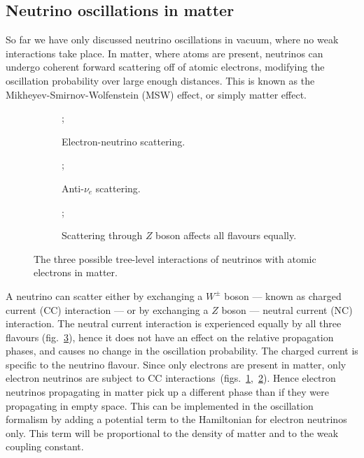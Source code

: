 \subsection{Neutrino oscillations in matter}
So far we have only discussed neutrino oscillations in vacuum, where no weak
interactions take place.
In matter, where atoms are present, neutrinos can undergo coherent forward
scattering off of atomic electrons, modifying the oscillation probability over
large enough distances. This is known as the Mikheyev-Smirnov-Wolfenstein (MSW)
effect\cite{wolfenstein, mikheyev-smirnov}, or simply matter effect.
\begin{figure}
	\centering
	\begin{subfigure}{0.3\textwidth}
		\centering
	;
		\caption{Electron-neutrino scattering.}
		\label{fig:nu_e-scatter}
	\end{subfigure}
	\begin{subfigure}{0.3\textwidth}
		\centering
		;
			\caption{Anti-$\nu_e$ scattering.}
			\label{fig:anti-nu_e-scatter}
	\end{subfigure}
	\begin{subfigure}{0.3\textwidth}
		\centering
		;
		\caption{Scattering through $Z$ boson affects all flavours equally.}
		\label{fig:z-scatter}
	\end{subfigure}
	\caption{The three possible tree-level interactions of neutrinos with atomic
	electrons in matter.}
\label{fig:forward_scatter}
\end{figure}

A neutrino can scatter either by exchanging a $W^\pm$ boson --- known as
charged current (CC) interaction --- or by exchanging a $Z$ boson --- neutral
current (NC) interaction. The neutral current interaction is experienced
equally by all three flavours (fig.~\ref{fig:z-scatter}), hence it does not
have an effect on the relative
propagation phases, and causes no change in the oscillation probability. The
charged current is specific to the neutrino flavour. Since only
electrons are present in matter, only electron neutrinos are subject to CC
interactions~(figs.~\ref{fig:nu_e-scatter},~\ref{fig:anti-nu_e-scatter}). 
Hence electron neutrinos propagating in matter pick up a different phase than
if they were propagating in empty space. This can be implemented in the
oscillation formalism by adding a potential term to the Hamiltonian for
electron neutrinos only. This term will be proportional to the density of
matter and to the weak coupling constant\cite{zuber}.

